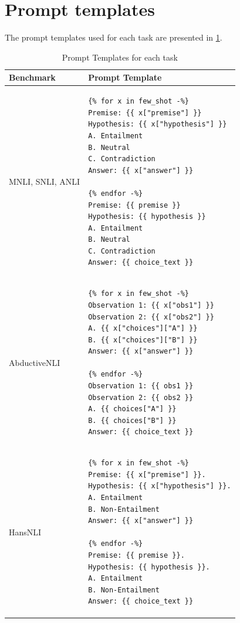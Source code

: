 \section{Prompt templates}

The prompt templates used for each task are presented in \cref{tab:prompt_template}.

\begin{table}[t]
    \centering
    \small
    \begin{tabular}{lp{8cm}}
        \toprule
        \textbf{Benchmark} & \textbf{Prompt Template} \\
        \midrule
        MNLI, SNLI, ANLI & \begin{verbatim}
{% for x in few_shot -%}
Premise: {{ x["premise"] }}
Hypothesis: {{ x["hypothesis"] }}
A. Entailment
B. Neutral
C. Contradiction
Answer: {{ x["answer"] }}

{% endfor -%}
Premise: {{ premise }}
Hypothesis: {{ hypothesis }}
A. Entailment
B. Neutral
C. Contradiction
Answer: {{ choice_text }}
\end{verbatim} \\
\midrule
AbductiveNLI & \begin{verbatim}
{% for x in few_shot -%}
Observation 1: {{ x["obs1"] }}
Observation 2: {{ x["obs2"] }}
A. {{ x["choices"]["A"] }}
B. {{ x["choices"]["B"] }}
Answer: {{ x["answer"] }}

{% endfor -%}
Observation 1: {{ obs1 }}
Observation 2: {{ obs2 }}
A. {{ choices["A"] }}
B. {{ choices["B"] }}
Answer: {{ choice_text }}
\end{verbatim} \\
\midrule
HansNLI & \begin{verbatim}
{% for x in few_shot -%}
Premise: {{ x["premise"] }}.
Hypothesis: {{ x["hypothesis"] }}.
A. Entailment
B. Non-Entailment
Answer: {{ x["answer"] }}

{% endfor -%}
Premise: {{ premise }}.
Hypothesis: {{ hypothesis }}.
A. Entailment
B. Non-Entailment
Answer: {{ choice_text }}
\end{verbatim} \\
\bottomrule
\end{tabular}
\caption{Prompt Templates for each task}
\label{tab:prompt_template}
\end{table}

